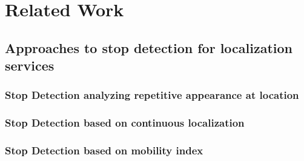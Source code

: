 \chapter{Related Work}
\label{cha:relatedwork}

\section{Approaches to stop detection for localization services}
\label{cha:introduction_appr_stopdet}

\subsection{Stop Detection analyzing repetitive appearance at location}

\subsection{Stop Detection based on continuous localization}

\subsection{Stop Detection based on mobility index}
\label{cha:introduction_mob_index_sect}

